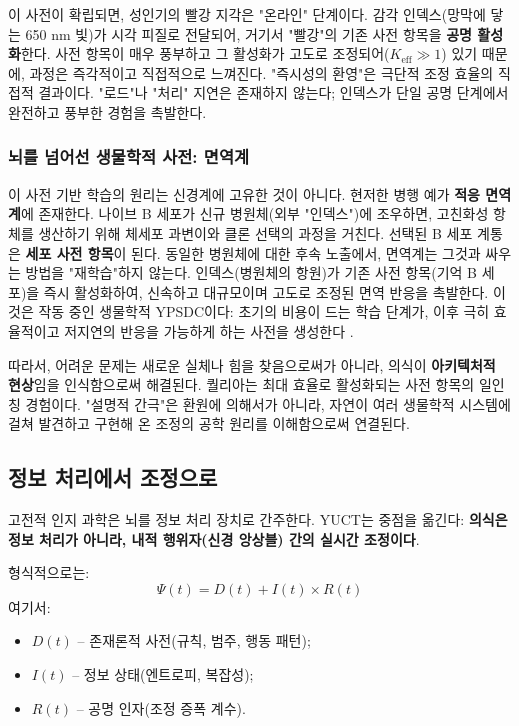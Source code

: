 \documentclass[12pt,a4paper]{article}
\begin{document}
	이 사전이 확립되면, 성인기의 빨강 지각은 "온라인" 단계이다. 감각 인덱스(망막에 닿는 650 nm 빛)가 시각 피질로 전달되어, 거기서 "빨강"의 기존 사전 항목을 \textbf{공명 활성화}한다. 사전 항목이 매우 풍부하고 그 활성화가 고도로 조정되어(\(K_{\mathrm{eff}} \gg 1\)) 있기 때문에, 과정은 즉각적이고 직접적으로 느껴진다. "즉시성의 환영"은 극단적 조정 효율의 직접적 결과이다. "로드"나 "처리" 지연은 존재하지 않는다; 인덱스가 단일 공명 단계에서 완전하고 풍부한 경험을 촉발한다.
	
	\subsubsection{뇌를 넘어선 생물학적 사전: 면역계}
	
	이 사전 기반 학습의 원리는 신경계에 고유한 것이 아니다. 현저한 병행 예가 \textbf{적응 면역계}에 존재한다. 나이브 B 세포가 신규 병원체(외부 "인덱스")에 조우하면, 고친화성 항체를 생산하기 위해 체세포 과변이와 클론 선택의 과정을 거친다. 선택된 B 세포 계통은 \textbf{세포 사전 항목}이 된다. 동일한 병원체에 대한 후속 노출에서, 면역계는 그것과 싸우는 방법을 "재학습"하지 않는다. 인덱스(병원체의 항원)가 기존 사전 항목(기억 B 세포)을 즉시 활성화하여, 신속하고 대규모이며 고도로 조정된 면역 반응을 촉발한다. 이것은 작동 중인 생물학적 YPSDC이다: 초기의 비용이 드는 학습 단계가, 이후 극히 효율적이고 저지연의 반응을 가능하게 하는 사전을 생성한다 \cite{Alberts2014}.
	
	따라서, 어려운 문제는 새로운 실체나 힘을 찾음으로써가 아니라, 의식이 \textbf{아키텍처적 현상}임을 인식함으로써 해결된다. 퀄리아는 최대 효율로 활성화되는 사전 항목의 일인칭 경험이다. "설명적 간극"은 환원에 의해서가 아니라, 자연이 여러 생물학적 시스템에 걸쳐 발견하고 구현해 온 조정의 공학 원리를 이해함으로써 연결된다.
	
	\subsection{정보 처리에서 조정으로}
	
	고전적 인지 과학은 뇌를 정보 처리 장치로 간주한다. YUCT는 중점을 옮긴다: \textbf{의식은 정보 처리가 아니라, 내적 행위자(신경 앙상블) 간의 실시간 조정이다}.
	
	형식적으로는:
	\[
	\Psi(t) = D(t) + I(t) \times R(t)
	\]
	여기서:
	\begin{itemize}
		\item $D(t)$ – 존재론적 사전(규칙, 범주, 행동 패턴);
		\item $I(t)$ – 정보 상태(엔트로피, 복잡성);
		\item $R(t)$ – 공명 인자(조정 증폭 계수).
	\end{itemize}
	
\end{document}
